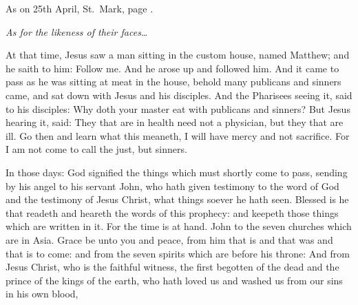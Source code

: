 \bigskip




As on 25th April, St.~Mark, page \pageref{Ep.stmark}.

\emph{As for the likeness of their faces\ldots}


At that time, Jesus saw a man sitting in the
custom house, named Matthew; and he saith to him: Follow me. And he
arose up and followed him.
And it came to pass as he was sitting at meat in the house, behold
many publicans and sinners came, and sat down with Jesus and his
disciples.
And the Pharisees seeing it, said to his disciples: Why doth your
master eat with publicans and sinners?
But Jesus hearing it, said: They that are in health need not a
physician, but they that are ill.
Go then and learn what this meaneth, I will have mercy and not
sacrifice. For I am not come to call the just, but sinners.








In those days: God signified the things which must shortly come to pass,
sending by his angel to his servant John,
who hath given testimony to the word of God and the testimony of
Jesus Christ, what things soever he hath seen.
Blessed is he that readeth and heareth the words of this prophecy:
and keepeth those things which are written in it. For the time is at
hand.
John to the seven churches which are in Asia. Grace be unto you and
peace, from him that is and that was and that is to come: and from the
seven spirits which are before his throne:
And from Jesus Christ, who is the faithful witness, the first
begotten of the dead and the prince of the kings of the earth, who hath
loved us and washed us from our sins in his own blood,



